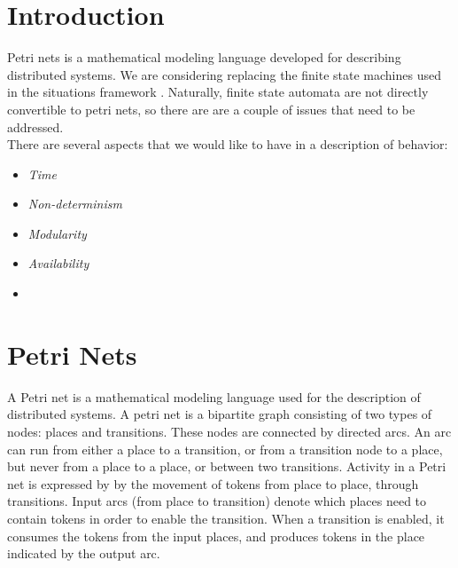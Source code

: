 \documentclass[11pt]{article}
\begin{document}
\maketitle

\section{Introduction}
Petri nets is a mathematical modeling language developed for describing distributed systems. We are considering replacing the finite state machines used in the situations framework \cite{Sung04scalablebehaviors}. Naturally, finite state automata are not directly convertible to petri nets, so there are are a couple of issues that need to be addressed.\\
There are several aspects that we would like to have in a description of behavior:
\begin{itemize}
\item \emph{Time}\\

\item \emph{Non-determinism}\\

\item \emph{Modularity}

\item \emph{Availability}

\item
\end{itemize}

\section{Petri Nets}
A Petri net is a mathematical modeling language used for the description of distributed systems. A petri net is a bipartite graph consisting of two types of nodes: places and transitions. These nodes are connected by directed arcs. An arc can run from either a place to a transition, or from a transition node to a place, but never from a place to a place, or between two transitions. Activity in a Petri net is expressed by by the movement of tokens from place to place, through transitions. Input arcs (from place to transition) denote which places need to contain tokens in order to enable the transition. When a transition is enabled, it consumes the tokens from the input places, and produces tokens in the place indicated by the output arc. 
\end{document}
